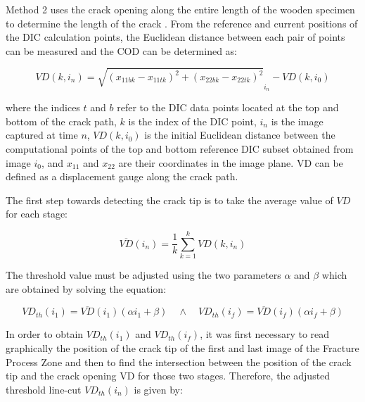 \documentclass[3p,times,procedia]{elsarticle}
\begin{document}
Method 2 uses the crack opening along the entire length of the wooden specimen to determine the length of the crack \citep{FilhoJ2022}. From the reference and current positions of the DIC calculation points, the Euclidean distance between each pair of points can be measured and the COD can be determined as:

\begin{equation}
	VD(k,i_n)=\sqrt{(x_{11bk}-x_{11tk})^2 + (x_{22bk}-x_{22tk})^2}_{i_n} - VD(k,i_0)
	\label{eq:eq23}
\end{equation}

\noindent where the indices $t$ and $b$ refer to the DIC data points located at the top and bottom of the crack path, $k$ is the index of the DIC point, $i_n$ is the image captured at time $n$, $VD(k, i_0)$ is the initial Euclidean distance between the computational points of the top and bottom reference DIC subset obtained from image $i_0$, and $x_{11}$ and $x_{22}$ are their coordinates in the image plane. VD can be defined as a displacement gauge along the crack path.



\noindent The first step towards detecting the crack tip is to take the average value of $VD$ for each stage:

\begin{equation}
	\overline{VD}(i_n)=\frac{1}{k} \sum_{k=1}^{k}VD(k,i_n)
	\label{eq:eq24}
\end{equation}

\noindent The threshold value must be adjusted using the two parameters $\alpha$ and $\beta$ which are obtained by solving the equation:

\begin{equation}
		VD_{th}(i_1)=\overline{VD}(i_1)(\alpha i_1 +\beta)
		\quad\wedge\quad
		VD_{th}(i_f)=\overline{VD}(i_f)(\alpha i_f +\beta)
	\label{eq:eq25}
\end{equation}

\noindent In order to obtain $VD_{th}(i_1)$ and $VD_{th}(i_f)$, it was first necessary to read graphically the position of the crack tip of the first and last image of the Fracture Process Zone and then to find the intersection between the position of the crack tip and the crack opening VD for those two stages. Therefore, the adjusted threshold line-cut $VD_{th}(i_n)$ is given by:
\end{document}
